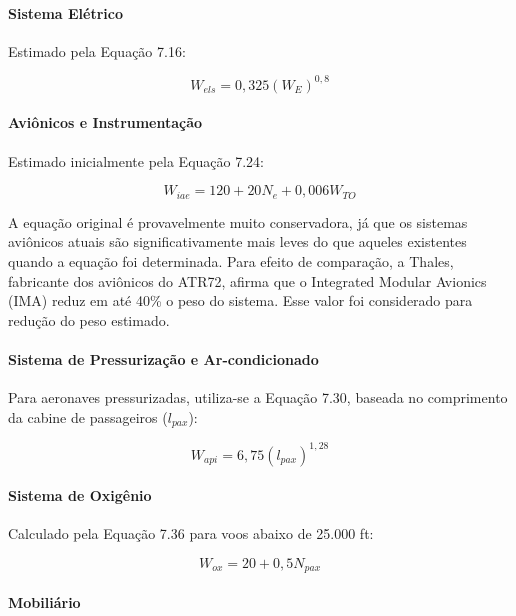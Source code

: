 \paragraph{Sistema Elétrico}

Estimado pela Equação 7.16:

\begin{equation}
    W_{els} = 0,325 (W_E)^{0,8}
\end{equation}

\paragraph{Aviônicos e Instrumentação}

Estimado inicialmente pela Equação 7.24:

\begin{equation}
    W_{iae} = 120 + 20N_e + 0,006W_{TO}
\end{equation}

A equação original é provavelmente muito conservadora, já que os sistemas aviônicos atuais são significativamente mais leves do que aqueles existentes quando a equação foi determinada. Para efeito de comparação, a Thales, fabricante dos aviônicos do ATR72, afirma que o Integrated Modular Avionics (IMA) reduz em até 40\% o peso do sistema. Esse valor foi considerado para redução do peso estimado.

\paragraph{Sistema de Pressurização e Ar-condicionado}

Para aeronaves pressurizadas, utiliza-se a Equação 7.30, baseada no comprimento da cabine de passageiros ($l_{pax}$):

\begin{equation}
    W_{api} = 6,75 (l_{pax})^{1,28}
\end{equation}

\paragraph{Sistema de Oxigênio}

Calculado pela Equação 7.36 para voos abaixo de 25.000 ft:

\begin{equation}
    W_{ox} = 20 + 0,5N_{pax}
\end{equation}


\paragraph{Mobiliário}

